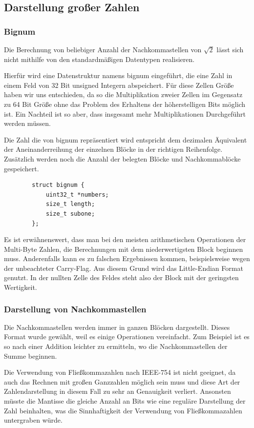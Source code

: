 \documentclass[course=erap]{aspdoc}
\begin{document}
	\subsection{Darstellung großer Zahlen}
	\subsubsection{Bignum}
	Die Berechnung von beliebiger Anzahl der Nachkommastellen von \(\sqrt{2}\) lässt sich nicht mithilfe von den standardmäßigen Datentypen realisieren.\newline
	
	Hierfür wird eine Datenstruktur namens bignum eingeführt, die eine Zahl in einem Feld von 32 Bit unsigned Integern abspeichert. Für diese Zellen Größe haben wir uns entschieden, da so die Multiplikation zweier Zellen im Gegensatz zu 64 Bit Größe ohne das Problem des Erhaltens der höherstelligen Bits möglich ist. Ein Nachteil ist so aber, dass insgesamt mehr Multiplikationen Durchgeführt werden müssen.
	
	Die Zahl die von bignum repräsentiert wird entspricht dem dezimalen Äquivalent der Aneinanderreihung der einzelnen Blöcke in der richtigen Reihenfolge. Zusätzlich werden noch die Anzahl der belegten Blöcke und Nachkommablöcke gespeichert. \newline
	
	\begin{lstlisting}
		struct bignum {
			uint32_t *numbers;
			size_t length;
			size_t subone;
		};
	\end{lstlisting}
	Es ist erwähnenswert, dass man bei den meisten arithmetischen Operationen der Multi-Byte Zahlen, die Berechnungen mit dem niederwertigsten Block beginnen muss. Anderenfalls kann es zu falschen Ergebnissen kommen, beispielsweise wegen der unbeachteter Carry-Flag. Aus diesem Grund wird das Little-Endian Format genutzt. In der nullten Zelle des Feldes steht also der Block mit der geringsten Wertigkeit.
	
	\subsubsection{Darstellung von Nachkommastellen} 
	Die Nachkommastellen werden immer in ganzen Blöcken dargestellt. Dieses Format wurde gewählt, weil es einige Operationen vereinfacht.
	Zum Beispiel ist es so nach einer Addition leichter zu ermitteln, wo die Nachkommastellen der Summe beginnen.\newline
	
	
	Die Verwendung von Fließkommazahlen nach IEEE-754 ist nicht geeignet, da auch das Rechnen mit großen Ganzzahlen möglich sein muss und diese Art der Zahlendarstellung in diesem Fall zu sehr an Genauigkeit verliert.
	Ansonsten müsste die Mantisse die gleiche Anzahl an Bits wie eine reguläre Darstellung der Zahl beinhalten, was die Sinnhaftigkeit der Verwendung von Fließkommazahlen untergraben würde.\newline
	
\end{document}
